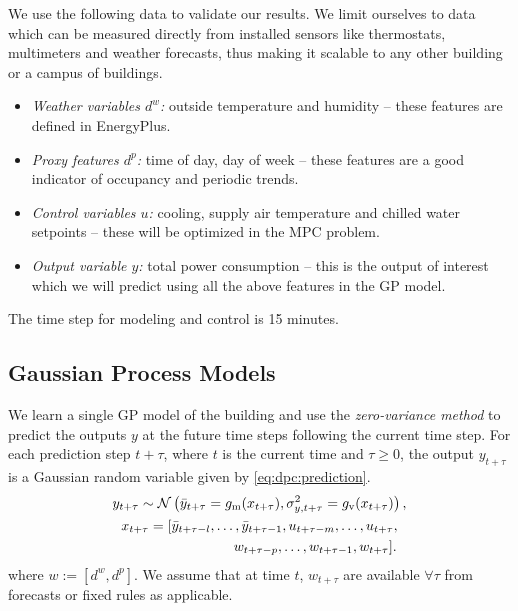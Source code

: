 We use the following data to validate our results. We limit ourselves to data which can be measured directly from installed sensors like thermostats, multimeters and weather forecasts, thus making it scalable to any other building or a campus of buildings.

\begin{itemize}
\item \textit{Weather variables \(d^w\):} outside temperature and humidity -- these features are defined in EnergyPlus.
\item \textit{Proxy features \(d^p\):} time of day, day of week -- these features are a good indicator of occupancy and periodic trends.
\item \textit{Control variables \(u\):} cooling, supply air temperature and chilled water setpoints -- these will be optimized in the MPC problem. %
\item \textit{Output variable \(y\):} total power consumption -- this is the output of interest which we will predict using all the above features in the GP model.
\end{itemize}

The time step for modeling and control is 15 minutes.

\subsection{Gaussian Process Models}
\label{SS:casestudy:gp}

We learn a single GP model of the building and use the \emph{zero-variance method} to predict the outputs \(y\) at the future time steps following the current time step.
For each prediction step $t+\tau$, where $t$ is the current time and \( \tau \ge 0\), %
the output \(y_{t+\tau}\) is a Gaussian random variable given by \eqref{eq:dpc:prediction}.
\begin{gather}
\label{E:gp:casestudy}
y_{t+\tau} \sim \GaussianDist{\bar{y}_{t+\tau} = g_{\mathrm m}(x_{t+\tau})}{\sigma^2_{y, t+\tau} = g_{\mathrm v}(x_{t+\tau})}, \\
x_{t + \tau} = [\bar y_{t+ \tau-l}, \dots, \bar y_{t+ \tau-1}, u_{t+ \tau-m}, \dots, u_{t+ \tau}, \nonumber \\
\qquad\qquad\qquad\qquad  w_{t+ \tau-p}, \dots, w_{t+ \tau-1}, w_{t+ \tau}]\text. \nonumber
\end{gather}
where \(w:=[d^w, d^p]\). We assume that at time \(t\), \(w_{t+\tau}\) are available \(\forall \tau \) from forecasts or fixed rules as applicable.

